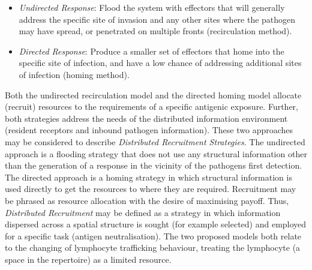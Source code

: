 \begin{itemize}
	\item \emph{Undirected Response}: Flood the system with effectors that will generally address the specific site of invasion and any other sites where the pathogen may have spread, or penetrated on multiple fronts (recirculation method).
	\item \emph{Directed Response}: Produce a smaller set of effectors that home into the specific site of infection, and have a low chance of addressing additional sites of infection (homing method).
\end{itemize}

Both the undirected recirculation model and the directed homing model allocate (recruit) resources to the requirements of a specific antigenic exposure. Further, both strategies address the needs of the distributed information environment (resident receptors and inbound pathogen information). These two approaches may be considered to describe \emph{Distributed Recruitment Strategies}. The undirected approach is a flooding strategy that does not use any structural information other than the generation of a response in the vicinity of the pathogens first detection. The directed approach is a homing strategy in which structural information is used directly to get the resources to where they are required. Recruitment may be phrased as resource allocation with the desire of maximising payoff. Thus, \emph{Distributed Recruitment} may be defined as a strategy in which information dispersed across a spatial structure is sought (for example selected) and employed for a specific task (antigen neutralisation). The two proposed models both relate to the changing of lymphocyte trafficking behaviour, treating the lymphocyte (a space in the repertoire) as a limited resource. 

%
%
